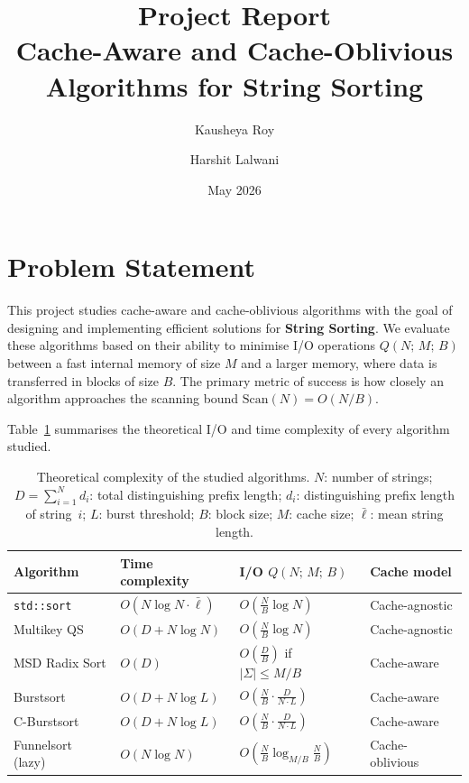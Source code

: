 \documentclass{article}
\title{Project Report \\[0.4em]
Cache-Aware and Cache-Oblivious Algorithms for String Sorting}
\author{Kausheya Roy \and Harshit Lalwani}
\date{May 2026}
\begin{document}
\maketitle

\section{Problem Statement}

This project studies cache-aware and cache-oblivious algorithms with the goal of
designing and implementing efficient solutions for \textbf{String Sorting}.  We evaluate
these algorithms based on their ability to minimise I/O operations
$Q(N;\,M;\,B)$ between a fast internal memory of size $M$ and a larger memory,
where data is transferred in blocks of size $B$.  The primary metric of success
is how closely an algorithm approaches the scanning bound
$\text{Scan}(N) = O(N/B)$.

Table~\ref{tab:complexity} summarises the theoretical I/O and time complexity of
every algorithm studied.

\begin{table}[h]
\centering
\caption{Theoretical complexity of the studied algorithms.
  $N$: number of strings; $D = \sum_{i=1}^{N} d_i$: total distinguishing prefix
  length; $d_i$: distinguishing prefix length of string~$i$; $L$: burst
  threshold; $B$: block size; $M$: cache size; $\bar\ell$: mean string length.}
\label{tab:complexity}
\begin{tabular}{@{}llll@{}}
\toprule
Algorithm           & Time complexity        & I/O $Q(N;\,M;\,B)$                        & Cache model \\ \midrule
\texttt{std::sort}  & $O(N \log N \cdot \bar\ell)$ & $O\!\left(\tfrac{N}{B}\log N\right)$ & Cache-agnostic \\
Multikey QS         & $O(D + N \log N)$      & $O\!\left(\tfrac{N}{B}\log N\right)$       & Cache-agnostic \\
MSD Radix Sort      & $O(D)$                 & $O\!\left(\tfrac{D}{B}\right)$ if $|\Sigma| \le M/B$ & Cache-aware \\
Burstsort           & $O(D + N \log L)$      & $O\!\left(\tfrac{N}{B} \cdot \tfrac{D}{N \cdot L}\right)$ & Cache-aware \\
C-Burstsort         & $O(D + N \log L)$      & $O\!\left(\tfrac{N}{B} \cdot \tfrac{D}{N \cdot L}\right)$ & Cache-aware \\
Funnelsort (lazy)   & $O(N \log N)$          & $O\!\left(\tfrac{N}{B}\log_{M/B}\tfrac{N}{B}\right)$ & Cache-oblivious \\ \bottomrule
\end{tabular}
\end{table}
\end{document}
